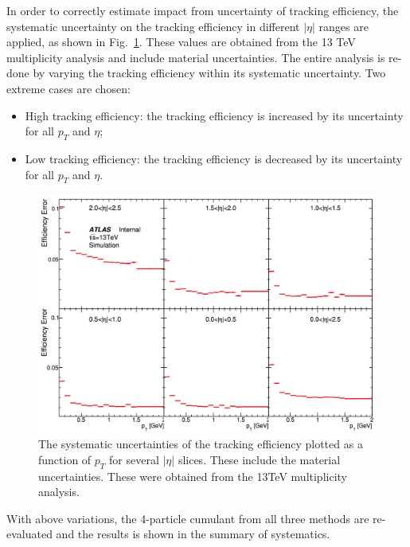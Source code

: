 In order to correctly estimate impact from uncertainty of tracking efficiency, the systematic uncertainty on the tracking efficiency in different $|\eta|$ ranges are applied, as shown in Fig.~\ref{fig:sys_pp13_trkEff_sys}. These values are obtained from the 13 TeV multiplicity analysis and include material uncertainties. The entire analysis is re-done by varying the tracking efficiency within its systematic uncertainty. Two extreme cases are chosen:
\begin{itemize}
\item High tracking efficiency: the tracking efficiency is increased by its uncertainty for all $p_{T}$ and $\eta$;
\item Low tracking efficiency: the tracking efficiency is decreased by its uncertainty for all $p_{T}$ and $\eta$.
\end{itemize}

\begin{figure}[H]
\centering
\includegraphics[width=0.8\linewidth]{figs/sec_sys/pp13/sys_pp13_trkEff_sys.png}
\caption{The systematic uncertainties of the tracking efficiency plotted as a function of $p_{T}$ for several $|\eta|$ slices. These include the material uncertainties. These were obtained from the 13TeV multiplicity analysis.}
\label{fig:sys_pp13_trkEff_sys}
\end{figure}
With above variations, the 4-particle cumulant from all three methods are re-evaluated and the results is shown in the summary of systematics.



